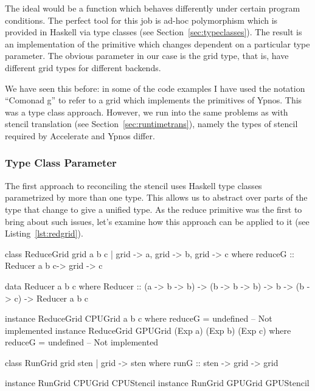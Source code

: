 \documentclass[
    12pt,
    a4paper,
    twoside,
    openright,
    ]{scrbook}
\begin{document}
The ideal would be a function which behaves differently under certain program
conditions. The perfect tool for this job is ad-hoc polymorphism which is
provided in Haskell via type classes (see Section~\ref{sec:typeclasses}). The
result is an implementation of the primitive which changes dependent on a
particular type parameter. The obvious parameter in our case is the grid type,
that is, have different grid types for different backends.

We have seen this before: in some of the code examples I have used the notation
``Comonad g'' to refer to a grid which implements the primitives of Ypnos. This
was a type class approach. However, we run into the same problems as with
stencil translation (see Section~\ref{sec:runtimetrans}), namely the types of
stencil required by Accelerate and Ypnos differ.

\subsubsection{Type Class Parameter}

The first approach to reconciling the stencil uses Haskell type classes
parametrized by more than one type. This allows us to abstract over parts of the
type that change to give a unified type. As the reduce primitive was the first
to bring about such issues, let's examine how this approach can be applied to it
(see Listing~\ref{lst:redgrid}).

\begin{hflisting}[label={lst:redgrid}, caption={The \texttt{ReduceGrid} type
class defined with type parameters for each variable: \texttt{a}, \texttt{b} and
\texttt{c}. The \texttt{RunGrid} type class has type parameter \texttt{grid} and
\texttt{sten} where the later is fully determined by the former.}]
class ReduceGrid grid a b c | grid -> a,
                              grid -> b,
                              grid -> c where
    reduceG :: Reducer a b c-> grid -> c

data Reducer a b c where
    Reducer ::   (a -> b -> b)
              -> (b -> b -> b)
              -> b
              -> (b -> c)
              -> Reducer a b c

instance ReduceGrid CPUGrid a b c where
    reduceG = undefined -- Not implemented
instance ReduceGrid GPUGrid (Exp a) (Exp b) (Exp c) where
    reduceG = undefined -- Not implemented

class RunGrid grid sten | grid -> sten where
    runG :: sten -> grid -> grid

instance RunGrid CPUGrid CPUStencil
instance RunGrid GPUGrid GPUStencil
\end{hflisting}
\end{document}
